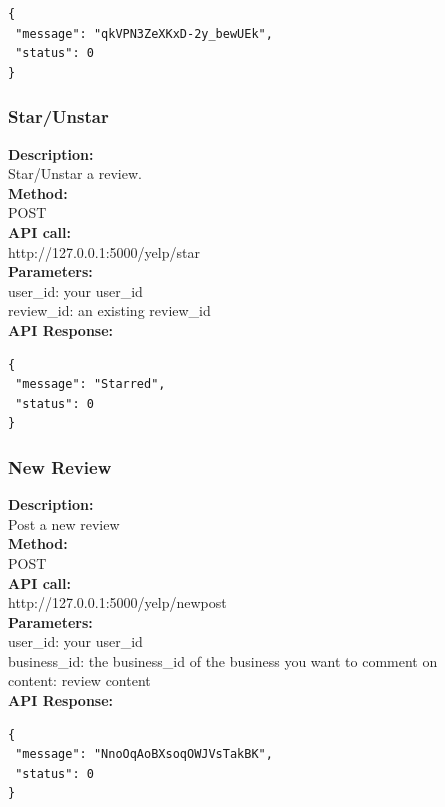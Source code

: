 \documentclass[12pt]{article}
\begin{document}
\begin{singlespacing}
\begin{lstlisting}
{
 "message": "qkVPN3ZeXKxD-2y_bewUEk",
 "status": 0
}
\end{lstlisting}
\end{singlespacing}

\subsubsection{Star/Unstar}
\textbf{Description:}\\
Star/Unstar a review.\\
\textbf{Method:}\\
POST\\
\textbf{API call:}\\
http://127.0.0.1:5000/yelp/star\\
\textbf{Parameters:}\\
user\_id: your user\_id\\
review\_id: an existing review\_id\\
\textbf{API Response:}

\begin{singlespacing}
\begin{lstlisting}
{
 "message": "Starred",
 "status": 0
}
\end{lstlisting}
\end{singlespacing}

\subsubsection{New Review}
\textbf{Description:}\\
Post a new review\\
\textbf{Method:}\\
POST\\
\textbf{API call:}\\
http://127.0.0.1:5000/yelp/newpost\\
\textbf{Parameters:}\\
user\_id: your user\_id\\
business\_id: the business\_id of the business you want to comment on\\
content: review content\\
\textbf{API Response:}

\begin{singlespacing}
\begin{lstlisting}
{
 "message": "NnoOqAoBXsoqOWJVsTakBK",
 "status": 0
}
\end{lstlisting}
\end{singlespacing}
\end{document}
